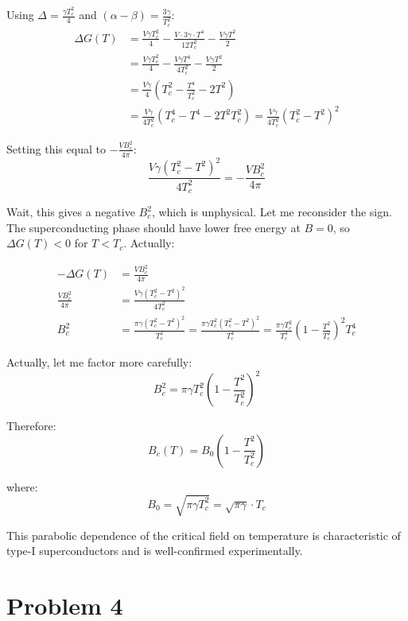 \documentclass[10pt,twocoloumn]{article}
\begin{document}
Using $\Delta = \frac{\gamma T_c^2}{4}$ and $(\alpha - \beta) = \frac{3\gamma}{T_c^2}$:
\begin{align}
    \Delta G(T) &= \frac{V\gamma T_c^2}{4} - \frac{V \cdot 3\gamma \cdot T^4}{12T_c^2} - \frac{V\gamma T^2}{2}\\
&= \frac{V\gamma T_c^2}{4} - \frac{V\gamma T^4}{4T_c^2} - \frac{V\gamma T^2}{2}\\
&= \frac{V\gamma}{4}\left(T_c^2 - \frac{T^4}{T_c^2} - 2T^2\right)\\
&= \frac{V\gamma}{4T_c^2}\left(T_c^4 - T^4 - 2T^2T_c^2\right) = \frac{V\gamma}{4T_c^2}\left(T_c^2 - T^2\right)^2
\end{align}

Setting this equal to $-\frac{VB_c^2}{4\pi}$:
\begin{equation}\frac{V\gamma(T_c^2 - T^2)^2}{4T_c^2} = -\frac{VB_c^2}{4\pi}\end{equation}

Wait, this gives a negative $B_c^2$, which is unphysical. Let me reconsider the sign. The superconducting phase should have lower free energy at $B=0$, so $\Delta G(T) < 0$ for $T < T_c$. Actually:

\begin{align}
    -\Delta G(T) &= \frac{VB_c^2}{4\pi}\\
\frac{VB_c^2}{4\pi} &= \frac{V\gamma(T_c^2 - T^2)^2}{4T_c^2}\\
B_c^2 &= \frac{\pi\gamma(T_c^2 - T^2)^2}{T_c^2} = \frac{\pi\gamma T_c^2(T_c^2 - T^2)^2}{T_c^4} = \frac{\pi\gamma T_c^2}{T_c^4}\left(1 - \frac{T^2}{T_c^2}\right)^2T_c^4
\end{align}

Actually, let me factor more carefully:
\begin{equation}B_c^2 = \pi\gamma T_c^2\left(1 - \frac{T^2}{T_c^2}\right)^2\end{equation}

Therefore:
\begin{equation}\boxed{B_c(T) = B_0\left(1 - \frac{T^2}{T_c^2}\right)}\end{equation}

where:
\begin{equation}\boxed{B_0 = \sqrt{\pi\gamma T_c^2} = \sqrt{\pi\gamma} \cdot T_c}\end{equation}

This parabolic dependence of the critical field on temperature is characteristic of type-I superconductors and is well-confirmed experimentally.
\section*{Problem 4}
\end{document}
